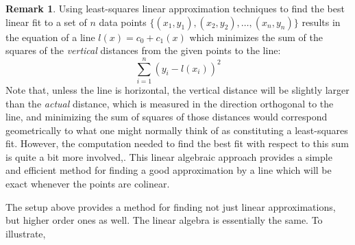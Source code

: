 \documentclass[11pt,notitlepage]{article}
\numberwithin{equation}{section}
\theoremstyle{plain}
\theoremstyle{definition}
\newtheorem{remark}[equation]{Remark}
\begin{document}
\begin{remark} Using least-squares linear approximation techniques to find the best linear fit to a set of $n$ data points $\{(x_1,y_1), (x_2,y_2),\dots,(x_n,y_n)\}$ results in the equation of a line $l(x) = c_0 + c_1(x)$ which minimizes the sum of the squares of the {\it vertical} distances from the given points to the line:
\[
\sum_{i=1}^n (y_i - l(x_i))^2
\]
Note that, unless the line is horizontal, the vertical distance will be slightly larger than the {\it actual} distance, which is measured in the direction orthogonal to the line, and minimizing the sum of squares of those distances would correspond geometrically to what one might normally think of as constituting a least-squares fit. However, the computation needed to find the best fit with respect to this sum is quite a bit more involved,. This linear algebraic approach provides a simple and efficient method for finding a good approximation by a line which will be exact whenever the points are colinear.
\end{remark}

The setup above provides a method for finding not just linear approximations, but higher order ones as well. The linear algebra is essentially the same. To illustrate,
\end{document}
